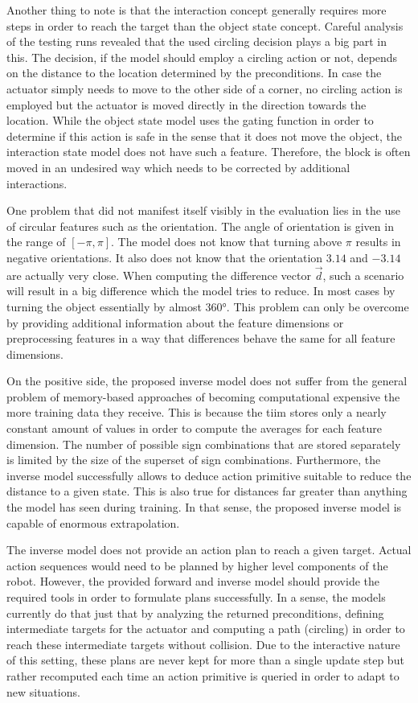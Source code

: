 Another thing to note is that the interaction concept generally requires more steps in order to reach the target than the object state concept. Careful analysis of the testing runs revealed that the used circling decision plays a big part in this. The decision, if the model should employ a circling action or not, depends on the distance to the location determined by the preconditions. In case the actuator simply needs to move to the other side of a corner, no circling action is employed but the actuator is moved directly in the direction towards the location. While the object state model uses the gating function in order to determine if this action is safe in the sense that it does not move the object, the interaction state model does not have such a feature. Therefore, the block is often moved in an undesired way which needs to be corrected by additional interactions.

One problem that did not manifest itself visibly in the evaluation lies in the use of circular features such as the orientation. The angle of orientation is given in the range of $[-\pi,\pi]$. The model does not know that turning above $\pi$ results in negative orientations. It also does not know that the orientation $3.14$ and $-3.14$ are actually very close. When computing the difference vector $\vec{d}$, such a scenario will result in a big difference which the model tries to reduce. In most cases by turning the object essentially by almost 360°. This problem can only be overcome by providing additional information about the feature dimensions or preprocessing features in a way that differences behave the same for all feature dimensions.

On the positive side, the proposed inverse model does not suffer from the general problem of memory-based approaches of becoming computational expensive the more training data they receive. This is because the \gls{tiim} stores only a nearly constant amount of values in order to compute the averages for each feature dimension. The number of possible sign combinations that are stored separately is limited by the size of the superset of sign combinations. Furthermore, the inverse model successfully allows to deduce action primitive suitable to reduce the distance to a given state. This is also true for distances far greater than anything the model has seen during training. In that sense, the proposed inverse model is capable of enormous extrapolation.

The inverse model does not provide an action plan to reach a given target. Actual action sequences would need to be planned by higher level components of the robot. 
However, the provided forward and inverse model should provide the required tools in order to formulate plans successfully.
In a sense, the models currently do that just that by analyzing the returned preconditions, defining intermediate targets for the actuator and computing a path (circling) in order to reach these intermediate targets without collision. Due to the interactive nature of this setting, these plans are never kept for more than a single update step but rather recomputed each time an action primitive is queried in order to adapt to new situations.

